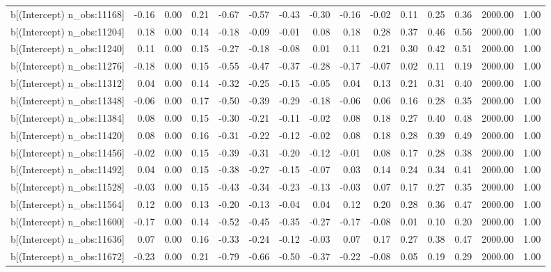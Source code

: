 \begin{table}[ht]
\begin{tabular}{rrrrrrrrrrrrrrr}
  b[(Intercept) n\_obs:11168] & -0.16 & 0.00 & 0.21 & -0.67 & -0.57 & -0.43 & -0.30 & -0.16 & -0.02 & 0.11 & 0.25 & 0.36 & 2000.00 & 1.00 \\ 
  b[(Intercept) n\_obs:11204] & 0.18 & 0.00 & 0.14 & -0.18 & -0.09 & -0.01 & 0.08 & 0.18 & 0.28 & 0.37 & 0.46 & 0.56 & 2000.00 & 1.00 \\ 
  b[(Intercept) n\_obs:11240] & 0.11 & 0.00 & 0.15 & -0.27 & -0.18 & -0.08 & 0.01 & 0.11 & 0.21 & 0.30 & 0.42 & 0.51 & 2000.00 & 1.00 \\ 
  b[(Intercept) n\_obs:11276] & -0.18 & 0.00 & 0.15 & -0.55 & -0.47 & -0.37 & -0.28 & -0.17 & -0.07 & 0.02 & 0.11 & 0.19 & 2000.00 & 1.00 \\ 
  b[(Intercept) n\_obs:11312] & 0.04 & 0.00 & 0.14 & -0.32 & -0.25 & -0.15 & -0.05 & 0.04 & 0.13 & 0.21 & 0.31 & 0.40 & 2000.00 & 1.00 \\ 
  b[(Intercept) n\_obs:11348] & -0.06 & 0.00 & 0.17 & -0.50 & -0.39 & -0.29 & -0.18 & -0.06 & 0.06 & 0.16 & 0.28 & 0.35 & 2000.00 & 1.00 \\ 
  b[(Intercept) n\_obs:11384] & 0.08 & 0.00 & 0.15 & -0.30 & -0.21 & -0.11 & -0.02 & 0.08 & 0.18 & 0.27 & 0.40 & 0.48 & 2000.00 & 1.00 \\ 
  b[(Intercept) n\_obs:11420] & 0.08 & 0.00 & 0.16 & -0.31 & -0.22 & -0.12 & -0.02 & 0.08 & 0.18 & 0.28 & 0.39 & 0.49 & 2000.00 & 1.00 \\ 
  b[(Intercept) n\_obs:11456] & -0.02 & 0.00 & 0.15 & -0.39 & -0.31 & -0.20 & -0.12 & -0.01 & 0.08 & 0.17 & 0.28 & 0.38 & 2000.00 & 1.00 \\ 
  b[(Intercept) n\_obs:11492] & 0.04 & 0.00 & 0.15 & -0.38 & -0.27 & -0.15 & -0.07 & 0.03 & 0.14 & 0.24 & 0.34 & 0.41 & 2000.00 & 1.00 \\ 
  b[(Intercept) n\_obs:11528] & -0.03 & 0.00 & 0.15 & -0.43 & -0.34 & -0.23 & -0.13 & -0.03 & 0.07 & 0.17 & 0.27 & 0.35 & 2000.00 & 1.00 \\ 
  b[(Intercept) n\_obs:11564] & 0.12 & 0.00 & 0.13 & -0.20 & -0.13 & -0.04 & 0.04 & 0.12 & 0.20 & 0.28 & 0.36 & 0.47 & 2000.00 & 1.00 \\ 
  b[(Intercept) n\_obs:11600] & -0.17 & 0.00 & 0.14 & -0.52 & -0.45 & -0.35 & -0.27 & -0.17 & -0.08 & 0.01 & 0.10 & 0.20 & 2000.00 & 1.00 \\ 
  b[(Intercept) n\_obs:11636] & 0.07 & 0.00 & 0.16 & -0.33 & -0.24 & -0.12 & -0.03 & 0.07 & 0.17 & 0.27 & 0.38 & 0.47 & 2000.00 & 1.00 \\ 
  b[(Intercept) n\_obs:11672] & -0.23 & 0.00 & 0.21 & -0.79 & -0.66 & -0.50 & -0.37 & -0.22 & -0.08 & 0.05 & 0.19 & 0.29 & 2000.00 & 1.00 \\ 

\end{tabular}
\end{table}
